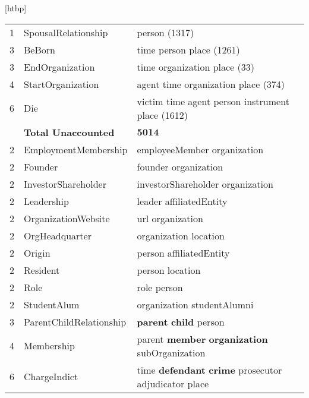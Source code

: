 \documentclass{tufte-handout}
\makeatletter
\newcommand{\cmr}[1]{{\color{red} #1}}
\renewenvironment{table}[1][htbp]{%
\@tufte@orig@float{table}[#1]}{%
\@tufte@orig@endfloat}%
\makeatother
\begin{document}
\begin{table}[htbp]
\begin{tabular}{l l l}
 1             & SpousalRelationship           & person (1317)                                     \\
 3             & BeBorn                        & time person place (1261)                          \\
 3             & EndOrganization               & time organization place (33)                      \\
 4             & StartOrganization             & agent time organization place (374)               \\
 6             & Die                           & victim time agent person instrument place (1612)  \\
               & \textbf{Total Unaccounted}    & $\mathbf{5014}$\\\midrule
 2             & EmploymentMembership          & employeeMember organization                       \\
 2             & Founder                       & founder organization                              \\
 2             & InvestorShareholder           & investorShareholder organization                  \\
 2             & Leadership                    & leader affiliatedEntity                           \\
 2             & OrganizationWebsite           & url organization                                  \\
 2             & OrgHeadquarter                & organization location                             \\
 2             & Origin                        & person affiliatedEntity                           \\
 2             & Resident                      & person location                                   \\
 2             & Role                          & role person                                       \\
 2             & StudentAlum                   & organization studentAlumni                        \\
 3             & ParentChildRelationship       & \textbf{parent} \textbf{child} \cmr{person}                               \\
 4             & Membership                    & \cmr{parent} \textbf{member} \textbf{organization} \cmr{subOrganization}        \\
 6             & ChargeIndict                  & \cmr{time} \textbf{defendant} \textbf{crime} \cmr{prosecutor} \cmr{adjudicator} \cmr{place} \\\bottomrule
  \end{tabular}
  \caption{Adept Dataset Categorization}
  \label{tab:adept-dataset-categ}
\end{table}
\end{document}
